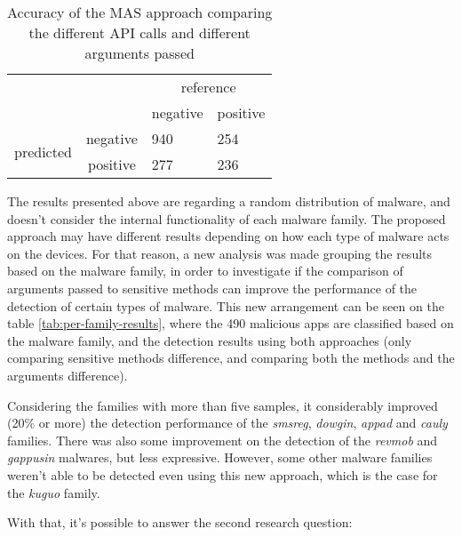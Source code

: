 \begin{table}[]
\centering
\caption{Accuracy of the MAS approach comparing the different API calls and different arguments passed}
\label{tab:new-confusion-matrix}
\begin{tabular}{llll}
                                                &                               & \multicolumn{2}{c}{reference}                                 \\ \cline{3-4} 
                                                & \multicolumn{1}{l|}{}         & \multicolumn{1}{c|}{negative} & \multicolumn{1}{c|}{positive} \\ \cline{2-4} 
\multicolumn{1}{c|}{\multirow{2}{*}{predicted}} & \multicolumn{1}{c|}{negative} & \multicolumn{1}{l|}{940}      & \multicolumn{1}{l|}{254}      \\ \cline{2-4} 
\multicolumn{1}{c|}{}                           & \multicolumn{1}{c|}{positive} & \multicolumn{1}{l|}{277}      & \multicolumn{1}{l|}{236}      \\ \cline{2-4} 
\end{tabular}
\end{table}

The results presented above are regarding a random distribution of malware, and doesn't consider the internal functionality of each malware family. The proposed approach may have different results depending on how each type of malware acts on the devices. For that reason, a new analysis was made grouping the results based on the malware family, in order to investigate if the comparison of arguments passed to sensitive methods can improve the performance of the detection of certain types of malware. This new arrangement can be seen on the table \ref{tab:per-family-results}, where the 490 malicious apps are classified based on the malware family, and the detection results using both approaches (only comparing sensitive methods difference, and comparing both the methods and the arguments difference).

Considering the families with more than five samples, it considerably improved (20\% or more) the detection performance of the \textit{smsreg}, \textit{dowgin}, \textit{appad} and \textit{cauly} families. There was also some improvement on the detection of the \textit{revmob} and \textit{gappusin} malwares, but less expressive. However, some other malware families weren't able to be detected even using this new approach, which is the case for the \textit{kuguo} family.

With that, it's possible to answer the second research question:

